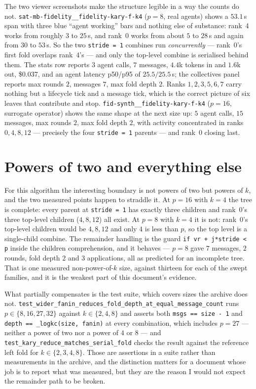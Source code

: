 \documentclass[11pt]{article}
\begin{document}
The two viewer screenshots make the structure legible in a way the counts do not.
\texttt{sat-mb-fidelity\_\_fidelity-kary-f-k4} ($p=8$, real agents) shows a $53.1$\,s span with
three blue ``agent working'' bars and nothing else of substance: rank~4 works from roughly $3$
to $25$\,s, and rank~0 works from about $5$ to $28$\,s and again from $30$ to $53$\,s. So the
two \texttt{stride = 1} combines run \emph{concurrently} --- rank~0's first fold overlaps
rank~4's --- and only the top-level combine is serialised behind them. The stats row reports
$3$ agent calls, $7$ messages, $4.4$k tokens in and $1.6$k out, \$0.037, and an agent latency
p50/p95 of $25.5/25.5$\,s; the collectives panel reports max rounds $2$, messages $7$, max fold
depth $2$. Ranks $1, 2, 3, 5, 6, 7$ carry nothing but a lifecycle tick and a message tick, which
is the correct picture of six leaves that contribute and stop.
\texttt{fid-synth\_\_fidelity-kary-f-k4} ($p=16$, surrogate operator) shows the same shape at
the next size up: $5$ agent calls, $15$ messages, max rounds $2$, max fold depth $2$, with
activity concentrated in ranks $0, 4, 8, 12$ --- precisely the four \texttt{stride = 1} parents
--- and rank~0 closing last.

\section{Powers of two and everything else}

For this algorithm the interesting boundary is not powers of two but powers of $k$, and the two
measured points happen to straddle it. At $p=16$ with $k=4$ the tree is complete: every parent
at \texttt{stride = 1} has exactly three children and rank~0's three top-level children
($4, 8, 12$) all exist. At $p=8$ with $k=4$ it is not: rank~0's top-level children would be
$4, 8, 12$ and only $4$ is less than $p$, so the top level is a single-child combine. The
remainder handling is the guard \texttt{if vr + j*stride < p} inside the children
comprehension, and it behaves --- $p=8$ gave $7$ messages, $2$ rounds, fold depth $2$ and $3$
applications, all as predicted for an incomplete tree. That is one measured non-power-of-$k$
size, against thirteen for each of the swept families, and it is the weakest part of this
document's evidence.

What partially compensates is the test suite, which covers sizes the archive does not.
\texttt{test\_wider\_fanin\_reduces\_fold\_depth\_at\_equal\_message\_count} runs $p \in
\{8, 16, 27, 32\}$ against $k \in \{2, 4, 8\}$ and asserts both
\texttt{msgs == size - 1} and \texttt{depth == \_logkc(size, fanin)} at every combination,
which includes $p=27$ --- neither a power of two nor a power of $4$ or $8$ --- and
\texttt{test\_kary\_reduce\_matches\_serial\_fold} checks the result against the reference
left fold for $k \in \{2, 3, 4, 8\}$. Those are assertions in a suite rather than measurements
in the archive, and the distinction matters for a document whose job is to report what was
measured, but they are the reason I would not expect the remainder path to be broken.
\end{document}
